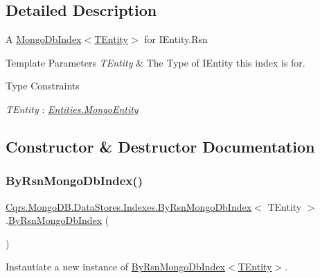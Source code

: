 \subsection{Detailed Description}
A \hyperlink{classCqrs_1_1MongoDB_1_1DataStores_1_1Indexes_1_1MongoDbIndex_a61f4b17dd968f92e81562c70ae062a89_a61f4b17dd968f92e81562c70ae062a89}{Mongo\+Db\+Index$<$\+T\+Entity$>$} for I\+Entity.\+Rsn 


\begin{DoxyTemplParams}{Template Parameters}
{\em T\+Entity} & The Type of I\+Entity this index is for.\\
\hline
\end{DoxyTemplParams}
\begin{Desc}
\item[Type Constraints]\begin{description}
\item[{\em T\+Entity} : {\em \hyperlink{classCqrs_1_1MongoDB_1_1Entities_1_1MongoEntity}{Entities.\+Mongo\+Entity}}]\end{description}
\end{Desc}


\subsection{Constructor \& Destructor Documentation}
\mbox{\label{classCqrs_1_1MongoDB_1_1DataStores_1_1Indexes_1_1ByRsnMongoDbIndex_acf6c8317e8ff8d9c3ffa592683e30665_acf6c8317e8ff8d9c3ffa592683e30665}} 
\subsubsection{\texorpdfstring{By\+Rsn\+Mongo\+Db\+Index()}{ByRsnMongoDbIndex()}}
{\footnotesize\ttfamily \hyperlink{classCqrs_1_1MongoDB_1_1DataStores_1_1Indexes_1_1ByRsnMongoDbIndex}{Cqrs.\+Mongo\+D\+B.\+Data\+Stores.\+Indexes.\+By\+Rsn\+Mongo\+Db\+Index}$<$ T\+Entity $>$.\hyperlink{classCqrs_1_1MongoDB_1_1DataStores_1_1Indexes_1_1ByRsnMongoDbIndex}{By\+Rsn\+Mongo\+Db\+Index} (\begin{DoxyParamCaption}{ }\end{DoxyParamCaption})\hspace{0.3cm}{\ttfamily [protected]}}



Instantiate a new instance of \hyperlink{classCqrs_1_1MongoDB_1_1DataStores_1_1Indexes_1_1ByRsnMongoDbIndex_acf6c8317e8ff8d9c3ffa592683e30665_acf6c8317e8ff8d9c3ffa592683e30665}{By\+Rsn\+Mongo\+Db\+Index$<$\+T\+Entity$>$}. 

